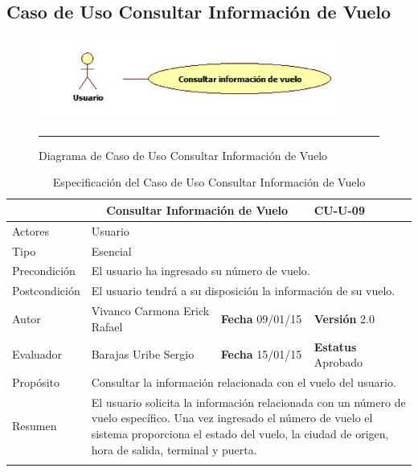 \subsection{Caso de Uso Consultar Información de Vuelo}

\begin{figure}[htbp]
	\centering
		\includegraphics[width=0.9\textwidth]{Figuras/cuConsultarInformacionVuelo.png}
		\rule{30em}{0.5pt}
	\caption[Diagrama de Caso de Uso Consultar Información de Vuelo]{Diagrama de Caso de Uso Consultar Información de Vuelo}
	\label{fig:cuConsultarInformacionVuelo}
\end{figure}

\begin{longtable}{|p{2.5cm}|p{6.4cm}|p{2cm}|p{2cm}|}
	\hline
		\rowcolor[RGB]{51,153,255}{Caso de Uso}&\multicolumn{2}{c}{Consultar Información de Vuelo}&{\textbf{CU-U-09}}\\
	\hline
		{Actores}&\multicolumn{3}{p{11.2cm}|}{Usuario}\\
	\hline
		{Tipo}&\multicolumn{3}{p{11.2cm}|}{Esencial}\\
	\hline
		{Precondición}&\multicolumn{3}{p{11.2cm}|}{El usuario ha ingresado su número de vuelo.}\\
	\hline
		{Postcondición}&\multicolumn{3}{p{11.2cm}|}{El usuario tendrá a su disposición la información de su vuelo.}\\
	\hline
		{Autor}&{Vivanco Carmona Erick Rafael}&{\textbf{Fecha} 09/01/15}&{\textbf{Versión} 2.0}\\
			\hline
		{Evaluador}&{Barajas Uribe Sergio}&{\textbf{Fecha} 15/01/15}&{\textbf{Estatus} Aprobado}\\
	\hline
		{Propósito}&\multicolumn{3}{p{11.2cm}|}{Consultar la información relacionada con el vuelo del usuario.}\\
	\hline
		{Resumen}&\multicolumn{3}{p{11.2cm}|}{El usuario solicita la información relacionada con un número de vuelo específico. Una vez ingresado el número de vuelo el sistema proporciona el estado del vuelo, la ciudad de origen, hora de salida, terminal y puerta.}\\	
	\hline
	\caption[Especificación del Caso de Uso Consultar Información de Vuelo]{Especificación del Caso de Uso Consultar Información de Vuelo}
    	\label{tab:cuConsultarInformacionVuelo}
\end{longtable}

